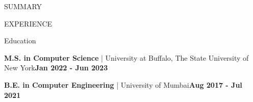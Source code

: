 \documentclass{resume}
\begin{document}
\vspace{\SpacerBelowSubtitle}

\vspace{\SpacerAboveCategory}
\begin{rSection}{SUMMARY}
\vspace{\SpacerBelowCategory}

\end{rSection}

\vspace{\SpacerAboveCategory}
\begin{rSection}{EXPERIENCE}
\vspace{\SpacerBelowCategory}










\end{rSection}


\vspace{\SpacerAboveCategory}
\begin{rSection}{Education}
\vspace{\SpacerBelowCategory}

\vspace{\SpacerAboveTopic}
\item{\textbf{M.S. in Computer Science} | University at Buffalo, The State University of New York\hfill \textbf{Jan 2022 - Jun 2023}}

\vspace{\SpacerCustom}

\item{\textbf{B.E. in Computer Engineering} | University of Mumbai\hfill \textbf{Aug 2017 - Jul 2021}}

\end{rSection}

\end{document}
